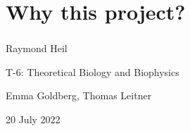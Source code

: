 \documentclass[aspectratio=169]{beamer}
\begin{document}
\section{Why this project?}

\begin{frame} \frametitle{}

    \begin{center}

        \vfill

        Raymond Heil

        T-6: Theoretical Biology and Biophysics

        Emma Goldberg, Thomas Leitner

        \vfill

        \scriptsize{20 July 2022}

    \end{center}


\end{frame}
\end{document}
